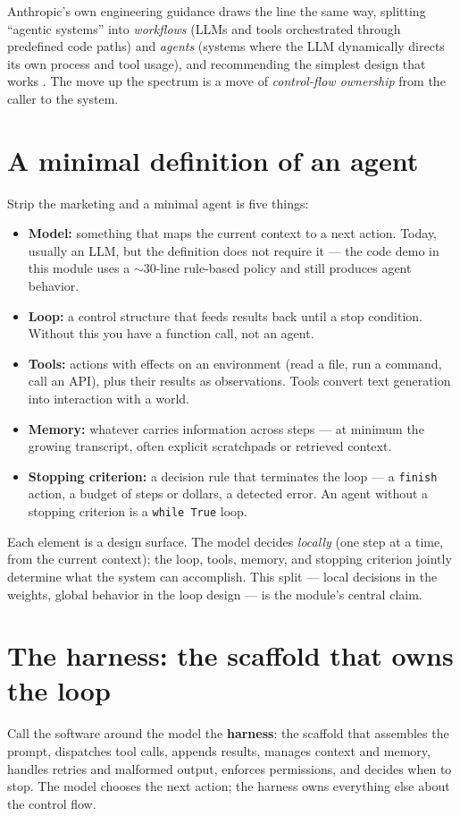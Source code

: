 \documentclass[11pt]{article}
\begin{document}
Anthropic's own engineering guidance draws the line the same way, splitting ``agentic systems'' into \emph{workflows} (LLMs and tools orchestrated through predefined code paths) and \emph{agents} (systems where the LLM dynamically directs its own process and tool usage), and recommending the simplest design that works \cite{anthropic2024agents}. The move up the spectrum is a move of \emph{control-flow ownership} from the caller to the system.

\section{A minimal definition of an agent}
Strip the marketing and a minimal agent is five things:

\begin{itemize}[noitemsep]
  \item \textbf{Model:} something that maps the current context to a next action. Today, usually an LLM, but the definition does not require it --- the code demo in this module uses a $\sim$30-line rule-based policy and still produces agent behavior.
  \item \textbf{Loop:} a control structure that feeds results back until a stop condition. Without this you have a function call, not an agent.
  \item \textbf{Tools:} actions with effects on an environment (read a file, run a command, call an API), plus their results as observations. Tools convert text generation into interaction with a world.
  \item \textbf{Memory:} whatever carries information across steps --- at minimum the growing transcript, often explicit scratchpads or retrieved context.
  \item \textbf{Stopping criterion:} a decision rule that terminates the loop --- a \texttt{finish} action, a budget of steps or dollars, a detected error. An agent without a stopping criterion is a \texttt{while True} loop.
\end{itemize}

Each element is a design surface. The model decides \emph{locally} (one step at a time, from the current context); the loop, tools, memory, and stopping criterion jointly determine what the system can accomplish. This split --- local decisions in the weights, global behavior in the loop design --- is the module's central claim.

\section{The harness: the scaffold that owns the loop}
Call the software around the model the \textbf{harness}: the scaffold that assembles the prompt, dispatches tool calls, appends results, manages context and memory, handles retries and malformed output, enforces permissions, and decides when to stop. The model chooses the next action; the harness owns everything else about the control flow.
\end{document}
